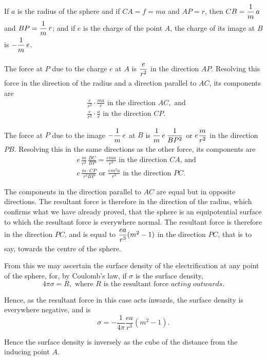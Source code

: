 \documentclass[12pt,oneside]{book}[2021/10/04]
\newcommand{\Runhead}[1]{\fancyhead[C]{\iffloatpage{}{\small#1}}}
\newcommand{\xp}{\rule[-2.0ex]{0pt}{5.2ex}}
\newcommand{\¬}{\hphantom{0}}
\begin{document}
If \(a\) is the radius of the sphere and if \(CA = f = ma\) and \(AP = r\),
then \(CB = \xp\dfrac{1}{m}\,a\) and \(BP = \xp\dfrac{1}{m}\,r\); and if \(e\) is the charge of the point
\(A\), the charge of its image at \(B\) is \(-\xp\dfrac{1}{m}\,e\).

The force at \(P\) due to the charge \(e\) at \(A\) is \(\xp\dfrac{e}{r^2}\) in the direction \(AP\).
Resolving this force in the direction of the radius and a direction
parallel to \(AC\), its components are
\begin{align*}
  &\frac{e}{r^2} \cdot \frac{ma}{r} \text{ in the direction } AC, \text{ and}\\
  &\frac{e}{r^2} \cdot \frac{a}{r} \text{ in the direction } CP\text{.}
\end{align*}

The force at \(P\) due to the image \(-\xp\dfrac{1}{m}\,e\) at \(B\) is \(\xp\dfrac{1}{m}\,e\,\dfrac{1}{BP^2}\) or \(e\xp\dfrac{m}{r^2}\)
in the direction \(PB\). Resolving this in the same directions as the
other force, its components are
\begin{align*}
  &e\,\frac{m}{r^2}\,\frac{BC}{BP} = \frac{ema}{r^3}\text{ in the direction } CA \text{, and}\\
  &e\,\frac{m \cdot CP}{r^2BP}\text{ or }\frac{em^2a}{r^3}\text{ in the direction } PC\text{.}
\end{align*}

The components in the direction parallel to \(AC\) are equal but in
opposite directions. The resultant force is therefore in the direction
of the radius, which confirms what we have already proved,
that the sphere is an equipotential surface to which the resultant
force is everywhere normal. The resultant force is therefore in the
direction \(PC\), and is equal to \(\xp\dfrac{ea}{r^3} (m^2 - 1)\) in the direction \(PC\), that is
to say, towards the centre of the sphere.
\Runhead{DENSITY OF INDUCED CHARGE.}

From this we may ascertain the surface density of the electrification
at any point of the sphere, for, by Coulomb's law, if \(\sigma\) is the
surface density,
\[
4 \pi \sigma = R, \text{ where } R \text{ is the resultant force} \textit{ acting outwards.}
\]

Hence, as the resultant force in this case acts inwards, the surface
density is everywhere negative, and is
\[
  \sigma = - \frac{1}{4\pi} \frac{ea}{r^3} (m^2 - 1)\text{.}
\]

Hence the surface density is inversely as the cube of the distance
from the inducing point \(A\).
\end{document}
